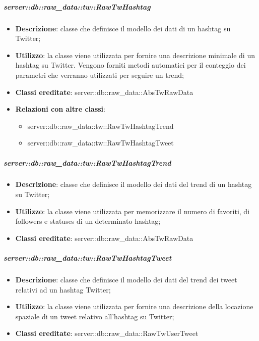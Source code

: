 		\subparagraph{server::db::raw\_data::tw::RawTwHashtag} %
		\label{subp:server_db_raw_data_tw_rawtwhashtag}
			\begin{itemize}
				\item \textbf{Descrizione}: classe che definisce il modello dei dati di un hashtag su Twitter;
				\item \textbf{Utilizzo}: la classe viene utilizzata per fornire una descrizione minimale di un hashtag su Twitter. Vengono forniti metodi automatici per il conteggio dei parametri che verranno utilizzati per seguire un trend;
				\item \textbf{Classi ereditate}: server::db::raw\_data::AbsTwRawData
				\item \textbf{Relazioni con altre classi}:
					\begin{itemize}
						\item server::db::raw\_data::tw::RawTwHashtagTrend
						\item server::db::raw\_data::tw::RawTwHashtagTweet
					\end{itemize}
			\end{itemize}


		\subparagraph{server::db::raw\_data::tw::RawTwHashtagTrend} %
		\label{subp:server_db_raw_data_tw_rawighashtagtrend}
			\begin{itemize}
				\item \textbf{Descrizione}: classe che definisce il modello dei dati del trend di un hashtag su Twitter;
				\item \textbf{Utilizzo}: la classe viene utilizzata per memorizzare il numero di favoriti, di followers e statuses di un determinato hashtag;
				\item \textbf{Classi ereditate}: server::db::raw\_data::AbsTwRawData
			\end{itemize}


		\subparagraph{server::db::raw\_data::tw::RawTwHashtagTweet} %
		\label{subp:server_db_raw_data_tw_rawtwhashtagtweet}
			\begin{itemize}
				\item \textbf{Descrizione}: classe che definisce il modello dei dati del trend dei tweet relativi ad un hashtag Twitter;
				\item \textbf{Utilizzo}: la classe viene utilizzata per fornire una descrizione della locazione spaziale di un tweet relativo all'hashtag su Twitter;
				\item \textbf{Classi ereditate}: server::db::raw\_data::RawTwUserTweet
			\end{itemize}


